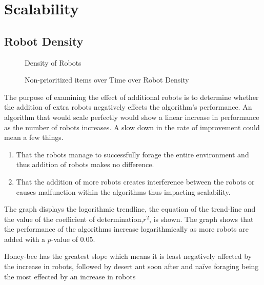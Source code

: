 
\section{Scalability}
\label{results:scability}

\subsection{Robot Density}
\label{results:numberenvironments}


\begin{figure}[!htb]
\centering
\resizebox{\textwidth}{!}{}
\caption{Density of Robots }
\label{robotsgoldplot}
\end{figure}

\begin{figure}[!htb]
\centering
\resizebox{\textwidth}{!}{}
\caption{Non-prioritized items over Time over Robot Density}
\label{robotswasteplot}
\end{figure}

The purpose of examining the effect of additional robots is to determine whether the addition of extra robots negatively effects the algorithm's performance. An algorithm that would scale perfectly would show a linear increase in performance as the number of robots increases. A slow down in the rate of improvement could mean a few things.

\begin{enumerate}
\item That the robots manage to successfully forage the entire environment and thus addition of robots makes no difference.
\item That the addition of more robots creates interference between the robots or causes malfunction within the algorithms thus impacting scalability. 
\end{enumerate}

The graph displays the logorithmic trendline, the equation of the trend-line and the value of the coefficient of determination,$r^2$, is shown. The graph shows that the performance of the algorithms increase logarithmically as more robots are added with a $p$-value of 0.05. 

Honey-bee has the greatest slope which means it is least negatively affected by the increase in robots, followed by desert ant soon after and na\"ive foraging being the most effected by an increase in robots

